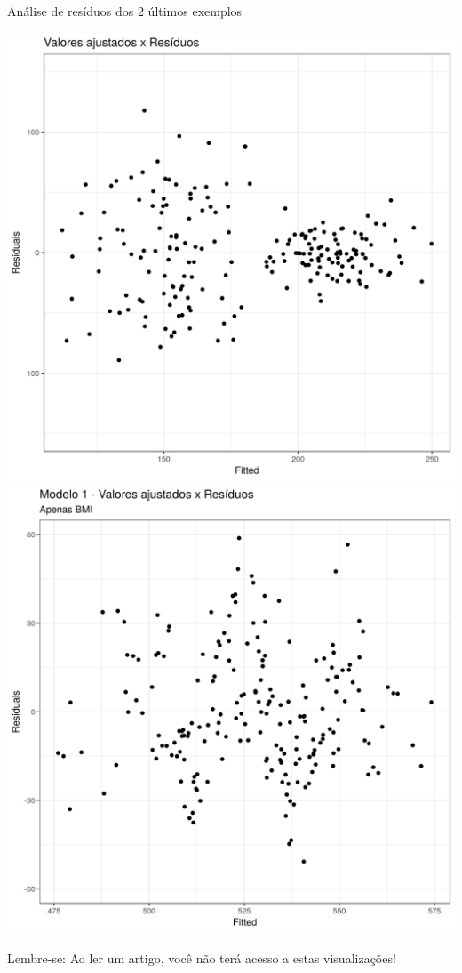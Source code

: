 \documentclass{beamer}
\begin{document}
\begin{frame}{\small Análise de resíduos dos 2 últimos exemplos}
  \begin{center}
    \includegraphics[height=.6\textheight]{Cap18-19/pratica-rls-het-resid}
    \includegraphics[height=.6\textheight]{Cap31-32/pratica-rlm1-resid}

    \vfill
    \scriptsize
    Lembre-se: Ao ler um artigo, você não terá acesso a estas visualizações!
  \end{center}
\end{frame}
\end{document}
